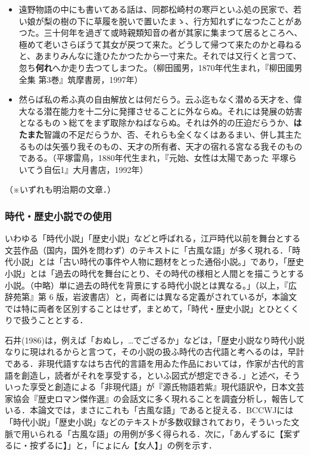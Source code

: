 \documentclass[japanese]{jnlp_1.4}
\begin{document}
\begin{itemize}
\item
遠野物語の中にも書いてある話は、同郡松崎村の寒戸といふ処の民家で、若い娘が梨の樹の下に草履を脱いで置いたまゝ、行方知れずになつたことがあつた。三十何年を過ぎて或時親類知音の者が其家に集まつて居るところへ、極めて老いさらぼうて其女が戻つて来た。どうして帰つて来たのかと尋ねると、あまりみんなに逢ひたかつたから一寸来た。それでは又行くと言つて、忽ち\textbf{何れ}へか走り去つてしまつた。（柳田國男，1870年代生まれ，『柳田國男全集 
第3巻』筑摩書房，1997年）

\item
然らば私の希ふ真の自由解放とは何だらう。云ふ迄もなく潜める天才を、偉大なる潜在能力を十二分に発揮させることに外ならぬ。それには発展の妨害となるものゝ総てをまず取除かねばならぬ。それは外的の圧迫だらうか、\textbf{はたまた}智識の不足だらうか、否、それらも全くなくはあるまい、併し其主たるものは矢張り我そのもの、天才の所有者、天才の宿れる宮なる我そのものである。（平塚雷鳥，1880年代生まれ，『元始、女性は太陽であった 
平塚らいてう自伝1』大月書店，1992年）
\end{itemize}

（※いずれも明治期の文章．）


\subsubsection{時代・歴史小説での使用}

いわゆる「時代小説」「歴史小説」などと呼ばれる，江戸時代以前を舞台とする文芸作品（国内，国外を問わず）のテキストに「古風な語」が多く現れる．「時代小説」とは「古い時代の事件や人物に題材をとった通俗小説。」であり，「歴史小説」とは「過去の時代を舞台にとり、その時代の様相と人間とを描こうとする小説。（中略）単に過去の時代を背景にする時代小説とは異なる。」（以上，『広辞苑第』第 6 版，岩波書店）と，両者には異なる定義がされているが，本論文では特に両者を区別することはせず，まとめて，「時代・歴史小説」とひとくくりで扱うこととする．

石井(1986)は，例えば「おぬし，…でござるか」などは，「歴史小説なり時代小説なりに現はれるからと言つて，その小説の扱ふ時代の古代語と考へるのは，早計である．非現代語すなはち古代的言語を用ゐた作品においては，作家が古代的言語を創造し，読者がそれを享受する，といふ図式が想定できる．」と述べ，そういった享受と創造による「非現代語」が『源氏物語若紫』現代語訳や，日本文芸家協会『歴史ロマン傑作選』の会話文に多く現れることを調査分析し，報告している．本論文では，まさにこれも「古風な語」であると捉える．BCCWJには「時代小説」「歴史小説」などのテキストが多数収録されており，そういった文脈で用いられる「古風な語」の用例が多く得られる．次に，「あんずるに【案ずるに・按ずるに】」と，「にょにん【女人】」の例を示す．
\end{document}

